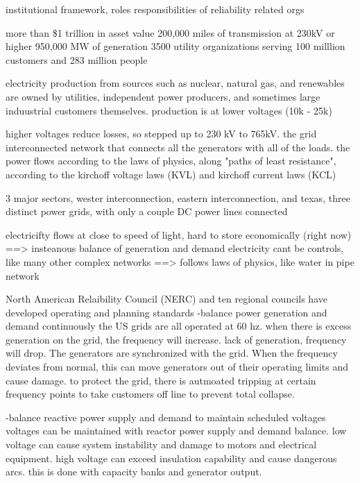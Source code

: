 
institutional framework, roles responsibilities of reliability related orgs

more than \$1 trillion in asset value
200,000 miles of transmission at 230kV or higher
950,000 MW of generation
3500 utility organizations serving 100 milllion customers and 283 million people


electricity production from sources such as nuclear, natural gas, and renewables are owned by utilities, independent power producers, and sometimes large induustrial customers themselves.  production is at lower voltages (10k - 25k)

higher voltages reduce losses, so stepped up to 230 kV to 765kV.  the grid  interconnected network that connects all the generators with all of the loads.  the power flows according to the laws of physics, along "paths of least resistance", according to the kirchoff voltage laws (KVL) and kirchoff current laws (KCL)

3 major sectors, wester interconnection, eastern interconnection, and texas, three distinct power grids, with only a couple DC power lines connected


electricifty flows at close to speed of light, hard to store economically (right now)
==> insteanous balance of generation and demand
electricity cant be controls, like many other complex networks
==> follows laws of physics, like water in pipe network

North American Relaibility Council (NERC) and ten regional councils have developed operating and planning standards
-balance power generation and demand continuously
the US grids are all operated at 60 hz.  when there is excess generation on the grid, the frequency will increase.  lack of generation, frequency will drop.  The generators are synchronized with the grid.  When the frequency deviates from normal, this can move generators out of their operating limits and cause damage.  to protect the grid, there is autmoated tripping at certain frequency points to take customers off line to prevent total collapse.

-balance reactive power supply and demand to maintain scheduled voltages
voltages can be maintained with reactor power supply and demand balance.  low voltage can cause system instability and damage to motors and electrical equipment.  high voltage can exceed insulation capability and cause dangerous arcs.  this is done with capacity banks and generator output.

